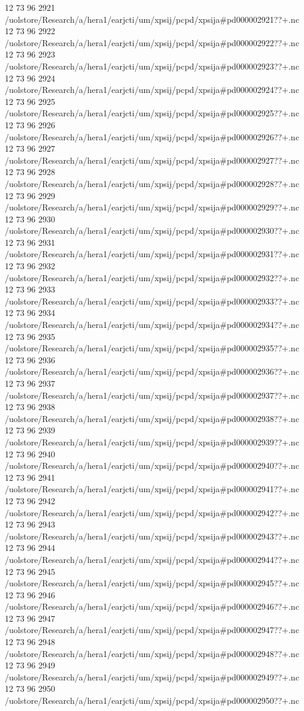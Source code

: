 12 73 96
2921
/uolstore/Research/a/hera1/earjcti/um/xpsij/pcpd/xpsija#pd000002921??+.nc
12 73 96
2922
/uolstore/Research/a/hera1/earjcti/um/xpsij/pcpd/xpsija#pd000002922??+.nc
12 73 96
2923
/uolstore/Research/a/hera1/earjcti/um/xpsij/pcpd/xpsija#pd000002923??+.nc
12 73 96
2924
/uolstore/Research/a/hera1/earjcti/um/xpsij/pcpd/xpsija#pd000002924??+.nc
12 73 96
2925
/uolstore/Research/a/hera1/earjcti/um/xpsij/pcpd/xpsija#pd000002925??+.nc
12 73 96
2926
/uolstore/Research/a/hera1/earjcti/um/xpsij/pcpd/xpsija#pd000002926??+.nc
12 73 96
2927
/uolstore/Research/a/hera1/earjcti/um/xpsij/pcpd/xpsija#pd000002927??+.nc
12 73 96
2928
/uolstore/Research/a/hera1/earjcti/um/xpsij/pcpd/xpsija#pd000002928??+.nc
12 73 96
2929
/uolstore/Research/a/hera1/earjcti/um/xpsij/pcpd/xpsija#pd000002929??+.nc
12 73 96
2930
/uolstore/Research/a/hera1/earjcti/um/xpsij/pcpd/xpsija#pd000002930??+.nc
12 73 96
2931
/uolstore/Research/a/hera1/earjcti/um/xpsij/pcpd/xpsija#pd000002931??+.nc
12 73 96
2932
/uolstore/Research/a/hera1/earjcti/um/xpsij/pcpd/xpsija#pd000002932??+.nc
12 73 96
2933
/uolstore/Research/a/hera1/earjcti/um/xpsij/pcpd/xpsija#pd000002933??+.nc
12 73 96
2934
/uolstore/Research/a/hera1/earjcti/um/xpsij/pcpd/xpsija#pd000002934??+.nc
12 73 96
2935
/uolstore/Research/a/hera1/earjcti/um/xpsij/pcpd/xpsija#pd000002935??+.nc
12 73 96
2936
/uolstore/Research/a/hera1/earjcti/um/xpsij/pcpd/xpsija#pd000002936??+.nc
12 73 96
2937
/uolstore/Research/a/hera1/earjcti/um/xpsij/pcpd/xpsija#pd000002937??+.nc
12 73 96
2938
/uolstore/Research/a/hera1/earjcti/um/xpsij/pcpd/xpsija#pd000002938??+.nc
12 73 96
2939
/uolstore/Research/a/hera1/earjcti/um/xpsij/pcpd/xpsija#pd000002939??+.nc
12 73 96
2940
/uolstore/Research/a/hera1/earjcti/um/xpsij/pcpd/xpsija#pd000002940??+.nc
12 73 96
2941
/uolstore/Research/a/hera1/earjcti/um/xpsij/pcpd/xpsija#pd000002941??+.nc
12 73 96
2942
/uolstore/Research/a/hera1/earjcti/um/xpsij/pcpd/xpsija#pd000002942??+.nc
12 73 96
2943
/uolstore/Research/a/hera1/earjcti/um/xpsij/pcpd/xpsija#pd000002943??+.nc
12 73 96
2944
/uolstore/Research/a/hera1/earjcti/um/xpsij/pcpd/xpsija#pd000002944??+.nc
12 73 96
2945
/uolstore/Research/a/hera1/earjcti/um/xpsij/pcpd/xpsija#pd000002945??+.nc
12 73 96
2946
/uolstore/Research/a/hera1/earjcti/um/xpsij/pcpd/xpsija#pd000002946??+.nc
12 73 96
2947
/uolstore/Research/a/hera1/earjcti/um/xpsij/pcpd/xpsija#pd000002947??+.nc
12 73 96
2948
/uolstore/Research/a/hera1/earjcti/um/xpsij/pcpd/xpsija#pd000002948??+.nc
12 73 96
2949
/uolstore/Research/a/hera1/earjcti/um/xpsij/pcpd/xpsija#pd000002949??+.nc
12 73 96
2950
/uolstore/Research/a/hera1/earjcti/um/xpsij/pcpd/xpsija#pd000002950??+.nc
